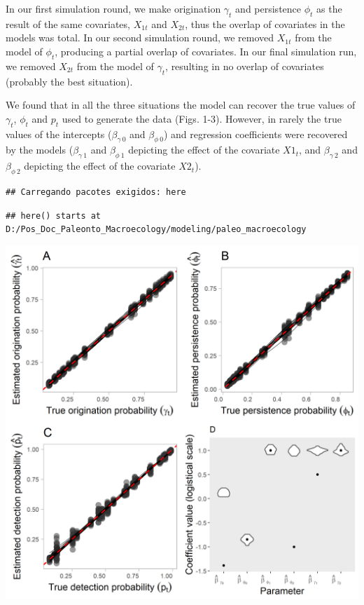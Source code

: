 \documentclass[
]{article}
\begin{document}
{In our first simulation round, we make origination \(\gamma_t\) and
persistence \(\phi_t\) as the result of the same covariates, \(X_{1t}\)
and \(X_{2t}\), thus the overlap of covariates in the models was total.
In our second simulation round, we removed \(X_{1t}\) from the model of
\(\phi_t\), producing a partial overlap of covariates. In our final
simulation run, we removed \(X_{2t}\) from the model of \(\gamma_t\),
resulting in no overlap of covariates (probably the best situation).

We found that in all the three situations the model can recover the true
values of \(\gamma_t\), \(\phi_t\) and \(p_t\) used to generate the data
(Figs. 1-3). However, in rarely the true values of the intercepts
(\(\beta_{\gamma~0}\) and \(\beta_{\phi~0}\)) and regression
coefficients were recovered by the models (\(\beta_{\gamma~1}\) and
\(\beta_{\phi~1}\) depicting the effect of the covariate \(X1_t\), and
\(\beta_{\gamma~2}\) and \(\beta_{\phi~2}\) depicting the effect of the
covariate \(X2_t\)).

\begin{verbatim}
## Carregando pacotes exigidos: here
\end{verbatim}

\begin{verbatim}
## here() starts at D:/Pos_Doc_Paleonto_Macroecology/modeling/paleo_macroecology
\end{verbatim}

\begin{center}\includegraphics[width=0.75\linewidth,height=0.75\textheight]{figs/sc1} \end{center}

}
\end{document}
